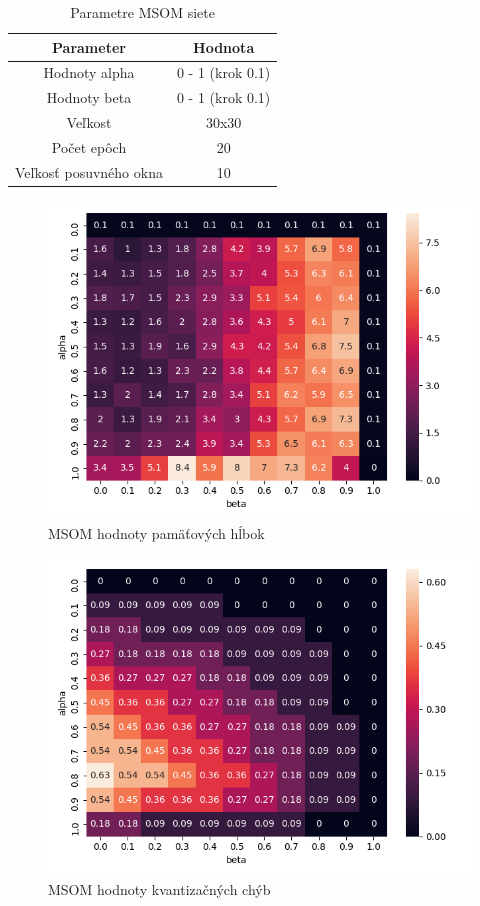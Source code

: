 \begin{table}[h!]
    \centering
    \begin{tabular}{|c|c|} 
     \hline
     Parameter & Hodnota \\ 
     \hline\hline
     Hodnoty alpha & 0 - 1 (krok 0.1)  \\ 
     \hline
     Hodnoty beta & 0 - 1  (krok 0.1) \\ 
     \hline
     Veľkost & 30x30  \\
     \hline
     Počet epôch & 20  \\
     \hline
     Veľkosť posuvného okna & 10  \\
     \hline
    \end{tabular}
    \caption{Parametre MSOM siete}
    \label{table:1}
    \end{table}
    
    \begin{figure}[H]
        \centering
        \includegraphics[width=\textwidth]{assets/m_memory_span}
        \caption{MSOM hodnoty pamäťových hĺbok}
        \label{msom_memory_span}
    \end{figure}
    
    \begin{figure}[H]
        \centering
        \includegraphics[width=\textwidth]{assets/m_errors}
        \caption{MSOM hodnoty kvantizačných chýb}
        \label{msom_errors}
    \end{figure}

